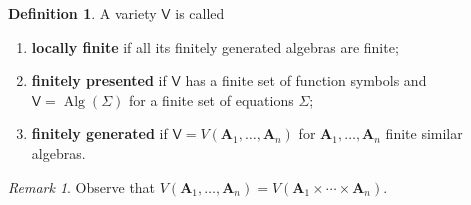 \documentclass{amsart}
\theoremstyle{plain}
\theoremstyle{definition}
\newtheorem{definition}[theorem]{Definition}
\theoremstyle{remark}
\newtheorem{remark}[theorem]{Remark}
\DeclareMathOperator{\Alg}{Alg}
\begin{document}
\begin{definition}
    A variety $\mathsf{V}$ is called 
    \begin{enumerate}
    \item \textbf{locally finite} if all its finitely generated algebras are finite; 
    \item \textbf{finitely presented} if $\mathsf{V}$ has a finite set of function symbols and $\mathsf{V}= \Alg(\Sigma)$ for a finite set of equations $\Sigma$; 
    \item \textbf{finitely generated} if $\mathsf{V}=V(\mathbf{A}_1, \ldots, \mathbf{A}_n)$ for $\mathbf{A}_1, \ldots, \mathbf{A}_n$ finite similar algebras. 
    \end{enumerate}
\end{definition}

\begin{remark}
    Observe that $V(\mathbf{A}_1, \ldots, \mathbf{A}_n)=V(\mathbf{A}_1 \times \cdots \times \mathbf{A}_n)$.  
\end{remark}
\end{document}
